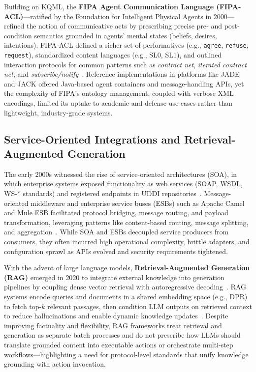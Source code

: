 \documentclass{article}
\begin{document}
Building on KQML, the \textbf{FIPA Agent Communication Language (FIPA‐ACL)}—ratified by the Foundation for Intelligent Physical Agents in 2000—refined the notion of communicative acts by prescribing precise pre‐ and post‐condition semantics grounded in agents’ mental states (beliefs, desires, intentions).  FIPA‐ACL defined a richer set of performatives (e.g., \texttt{agree}, \texttt{refuse}, \texttt{request}), standardized content languages (e.g., SL0, SL1), and outlined interaction protocols for common patterns such as \emph{contract net}, \emph{iterated contract net}, and \emph{subscribe/notify}~\cite{fipa2000acl}.  Reference implementations in platforms like JADE and JACK offered Java‐based agent containers and message‐handling APIs, yet the complexity of FIPA’s ontology management, coupled with verbose XML encodings, limited its uptake to academic and defense use cases rather than lightweight, industry‐grade systems.




\subsection{Service-Oriented Integrations and Retrieval-Augmented Generation}
The early 2000s witnessed the rise of service-oriented architectures (SOA), in which enterprise systems exposed functionality as web services (SOAP, WSDL, WS-* standards) and registered endpoints in UDDI repositories~\cite{curbera2002web}. Message-oriented middleware and enterprise service buses (ESBs) such as Apache Camel and Mule ESB facilitated protocol bridging, message routing, and payload transformation, leveraging patterns like content-based routing, message splitting, and aggregation~\cite{hohpe2006enterprise}. While SOA and ESBs decoupled service producers from consumers, they often incurred high operational complexity, brittle adapters, and configuration sprawl as APIs evolved and security requirements tightened.

With the advent of large language models, \textbf{Retrieval-Augmented Generation (RAG)} emerged in 2020 to integrate external knowledge into generation pipelines by coupling dense vector retrieval with autoregressive decoding~\cite{lewis2020rag}. RAG systems encode queries and documents in a shared embedding space (e.g., DPR) to fetch top-$k$ relevant passages, then condition LLM outputs on retrieved context to reduce hallucinations and enable dynamic knowledge updates~\cite{izacard2021towards}. Despite improving factuality and flexibility, RAG frameworks treat retrieval and generation as separate batch processes and do not prescribe how LLMs should translate grounded content into executable actions or orchestrate multi-step workflows—highlighting a need for protocol-level standards that unify knowledge grounding with action invocation.
\end{document}

